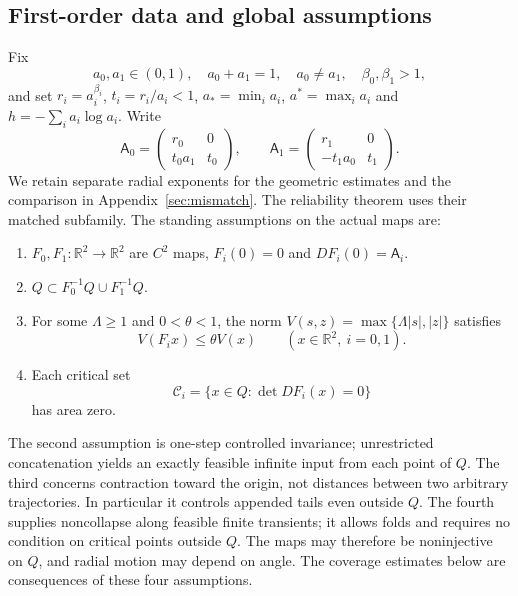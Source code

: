 \documentclass[11pt]{amsart}
\theoremstyle{definition}
\theoremstyle{remark}
\newcommand{\R}{\mathbb R}
\numberwithin{equation}{section}
\begin{document}
\subsection{First-order data and global assumptions}
Fix
\begin{equation}\label{eq:parameters}
a_0,a_1\in(0,1),\quad a_0+a_1=1,\quad a_0\ne a_1,\quad
\beta_0,\beta_1>1,
\end{equation}
and set $r_i=a_i^{\beta_i}$, $t_i=r_i/a_i<1$,
$a_* =\min_i a_i$, $a^*=\max_i a_i$ and $h=-\sum_i a_i\log a_i$.
Write
\begin{equation}\label{eq:jets}
\mathsf A_0=\begin{pmatrix}r_0&0\\t_0a_1&t_0\end{pmatrix},
\qquad
\mathsf A_1=\begin{pmatrix}r_1&0\\-t_1a_0&t_1\end{pmatrix}.
\end{equation}
We retain separate radial exponents for the geometric estimates
and the comparison in Appendix~\ref{sec:mismatch}. The
reliability theorem uses their matched subfamily. The standing
assumptions on the actual maps are:
\begin{enumerate}
\item $F_0,F_1:\R^2\to\R^2$ are $C^2$ maps,
$F_i(0)=0$ and $DF_i(0)=\mathsf A_i$.
\item $Q\subset F_0^{-1}Q\cup F_1^{-1}Q$.
\item For some $\Lambda\ge1$ and $0<\theta<1$, the norm
$V(s,z)=\max\{\Lambda|s|,|z|\}$ satisfies
\begin{equation}\label{eq:contract}
V(F_i x)\le\theta V(x)\qquad(x\in\R^2,\ i=0,1).
\end{equation}
\item Each critical set
\begin{equation}\label{eq:critical}
\mathcal C_i=\{x\in Q:\det DF_i(x)=0\}
\end{equation}
has area zero.
\end{enumerate}
The second assumption is one-step controlled invariance; unrestricted
concatenation yields an exactly feasible infinite input from each
point of $Q$. The third concerns contraction toward the origin,
not distances between two arbitrary trajectories. In particular it
controls appended tails even outside $Q$. The fourth supplies
noncollapse along feasible finite transients; it allows folds and
requires no condition on critical points outside $Q$.
The maps may therefore be noninjective on $Q$, and radial motion
may depend on angle. The coverage estimates below are consequences
of these four assumptions.
\end{document}
